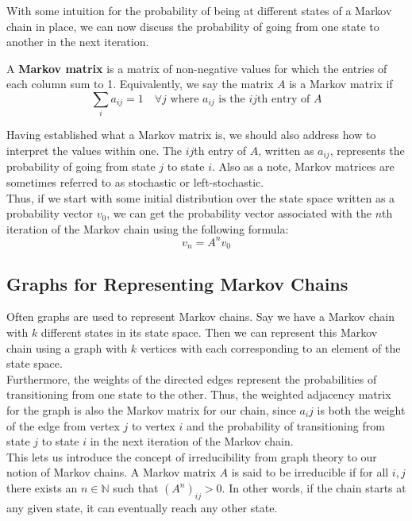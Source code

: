 \documentclass[10pt]{article}
\newenvironment{defn}[2][Definition:]{\begin{trivlist}
\item[\hskip \labelsep {\bfseries #1}\hskip \labelsep {\bfseries #2}]}{\end{trivlist}}
\newcommand{\N}{\mathbb{N}}
\begin{document}
With some intuition for the probability of being at different states of a Markov chain in place, we can now discuss the probability of going from one state to another in the next iteration.
\begin{defn}{}
A \textbf{Markov matrix} is a matrix of non-negative values for which the entries of each column sum to 1. Equivalently, we say the matrix $A$ is a Markov matrix if
\[\sum_{i} a_{ij}=1 \quad \forall j \text{ where $a_{ij}$ is the $ij$th entry of $A$}\]
\end{defn}
Having established what a Markov matrix is, we should also address how to interpret the values within one. The $ij$th entry of $A$, written as $a_{ij}$, represents the probability of going from state $j$ to state $i$. Also as a note, Markov matrices are sometimes referred to as stochastic or left-stochastic.\vspace{0.5cm}\\
Thus, if we start with some initial distribution over the state space written as a probability vector $v_0$, we can get the probability vector associated with the $n$th iteration of the Markov chain using the following formula:
\[v_n = A^n v_0\]
\subsection{Graphs for Representing Markov Chains}
Often graphs are used to represent Markov chains. Say we have a Markov chain with $k$ different states in its state space. Then we can represent this Markov chain using a graph with $k$ vertices with each corresponding to an element of the state space.\vspace{0.5cm}\\
Furthermore, the weights of the directed edges represent the probabilities of transitioning from one state to the other. Thus, the weighted adjacency matrix for the graph is also the Markov matrix for our chain, since $a_ij$ is both the weight of the edge from vertex $j$ to vertex $i$ and the probability of transitioning from state $j$ to state $i$ in the next iteration of the Markov chain.\vspace{0.5cm}\\
This lets us introduce the concept of irreducibility from graph theory to our notion of Markov chains. A Markov matrix $A$ is said to be irreducible if for all $i,j$ there exists an $n\in\N$ such that $(A^n)_{ij}>0$. In other words, if the chain starts at any given state, it can eventually reach any other state.
\end{document}
